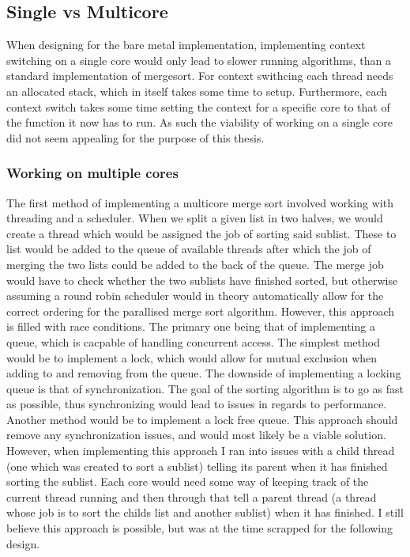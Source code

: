 
\subsection{Single vs Multicore}
When designing for the bare metal implementation, implementing context switching on a single core would only lead to slower running algorithms, than a standard implementation of mergesort. For context swithcing each thread needs an allocated stack, which in itself takes some time to setup. Furthermore, each context switch takes some time setting the context for a specific core to that of the function it now has to run. As such the viability of working on a single core did not seem appealing for the purpose of this thesis.

\subsubsection{Working on multiple cores}
The first method of implementing a multicore merge sort involved working with threading and a scheduler. When we split a given list in two halves, we would create a thread which would be assigned the job of sorting said sublist. These to list would be added to the queue of available threads after which the job of merging the two lists could be added to the back of the queue. The merge job would have to check whether the two sublists have finished sorted, but otherwise assuming a round robin scheduler would in theory automatically allow for the correct ordering for the parallised merge sort algorithm. However, this approach is filled with race conditions. The primary one being that of implementing a queue, which is cacpable of handling concurrent access. The simplest method would be to implement a lock, which would allow for mutual exclusion when adding to and removing from the queue. The downside of implementing a locking queue is that of synchronization. The goal of the sorting algorithm is to go as fast as possible, thus synchronizing would lead to issues in regards to performance. Another method would be to implement a lock free queue. This approach should remove any synchronization issues, and would most likely be a viable solution. However, when implementing this approach I ran into issues with a child thread (one which was created to sort a sublist) telling its parent when it has finished sorting the sublist. Each core would need some way of keeping track of the current thread running and then through that tell a parent thread (a thread whose job is to sort the childs list and another sublist) when it has finished. I still believe this approach is possible, but was at the time scrapped for the following design.

